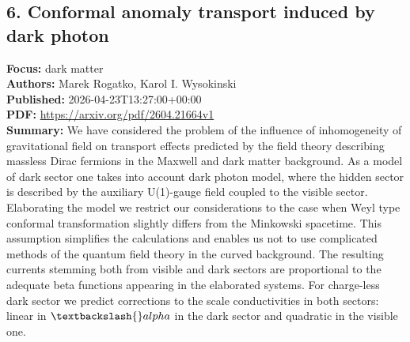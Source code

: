\documentclass[11pt]{article}
\begin{document}
\subsection*{6. Conformal anomaly transport induced by dark photon}
\textbf{Focus:} dark matter\\
\textbf{Authors:} Marek Rogatko, Karol I. Wysokinski\\
\textbf{Published:} 2026-04-23T13:27:00+00:00\\
\textbf{PDF:} \href{https://arxiv.org/pdf/2604.21664v1}{https://arxiv.org/pdf/2604.21664v1}\\
\textbf{Summary:}
We have considered the problem of the influence of inhomogeneity of gravitational field on transport effects predicted by the field theory describing massless Dirac fermions in the Maxwell and dark matter background. As a model of dark sector one takes into account dark photon model, where the hidden sector is described by the auxiliary U(1)-gauge field coupled to the visible sector. Elaborating the model we restrict our considerations to the case when Weyl type conformal transformation slightly differs from the Minkowski spacetime. This assumption simplifies the calculations and enables us not to use complicated methods of the quantum field theory in the curved background. The resulting currents stemming both from visible and dark sectors are proportional to the adequate beta functions appearing in the elaborated systems. For charge-less dark sector we predict corrections to the scale conductivities in both sectors: linear in $\textbackslash{}alpha$ in the dark sector and quadratic in the visible one.
\newpage
\end{document}
